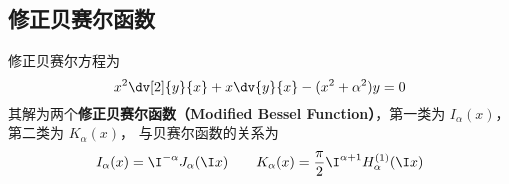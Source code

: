 \subsection{修正贝赛尔函数}
修正贝赛尔方程为
\begin{equation}
x^2 \dv[2]{y}{x} + x \dv{y}{x} - (x^2 + \alpha ^2)y = 0
\end{equation}
其解为两个\textbf{修正贝赛尔函数（Modified Bessel Function）}，第一类为 $I_\alpha(x)$，  第二类为 $K_\alpha(x)$，  与贝赛尔函数的关系为
\begin{equation}
I_\alpha(x) = \I^{-\alpha} J_\alpha(\I x)
\qquad
K_\alpha(x) = \frac{\pi}{2} \I^{\alpha  + 1} H_\alpha ^{(1)}(\I x)
\end{equation}

